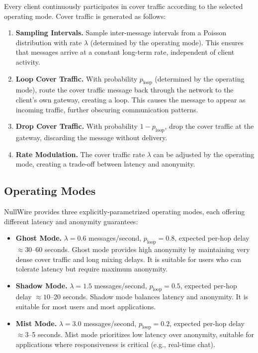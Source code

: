 \documentclass[11pt]{article}
\theoremstyle{definition}
\theoremstyle{remark}
\begin{document}
Every client continuously participates in cover traffic according to the selected operating mode. Cover traffic is generated as follows:

\begin{enumerate}
    \item \textbf{Sampling Intervals.} Sample inter-message intervals from a Poisson distribution with rate $\lambda$ (determined by the operating mode). This ensures that messages arrive at a constant long-term rate, independent of client activity.

    \item \textbf{Loop Cover Traffic.} With probability $p_{\text{loop}}$ (determined by the operating mode), route the cover traffic message back through the network to the client's own gateway, creating a loop. This causes the message to appear as incoming traffic, further obscuring communication patterns.

    \item \textbf{Drop Cover Traffic.} With probability $1 - p_{\text{loop}}$, drop the cover traffic at the gateway, discarding the message without delivery.

    \item \textbf{Rate Modulation.} The cover traffic rate $\lambda$ can be adjusted by the operating mode, creating a trade-off between latency and anonymity.
\end{enumerate}

\subsection{Operating Modes}
\label{subsec:modes}

NullWire provides three explicitly-parametrized operating modes, each offering different latency and anonymity guarantees:

\begin{itemize}
    \item \textbf{Ghost Mode.} $\lambda = 0.6$ messages/second, $p_{\text{loop}} = 0.8$, expected per-hop delay $\approx 30$--60 seconds. Ghost mode provides high anonymity by maintaining very dense cover traffic and long mixing delays. It is suitable for users who can tolerate latency but require maximum anonymity.

    \item \textbf{Shadow Mode.} $\lambda = 1.5$ messages/second, $p_{\text{loop}} = 0.5$, expected per-hop delay $\approx 10$--20 seconds. Shadow mode balances latency and anonymity. It is suitable for most users and most applications.

    \item \textbf{Mist Mode.} $\lambda = 3.0$ messages/second, $p_{\text{loop}} = 0.2$, expected per-hop delay $\approx 3$--5 seconds. Mist mode prioritizes low latency over anonymity, suitable for applications where responsiveness is critical (e.g., real-time chat).
\end{itemize}
\end{document}

